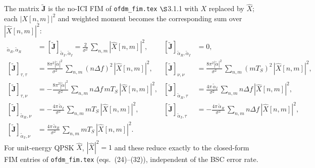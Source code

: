 \documentclass[11pt]{article}
\begin{document}
The matrix \(\tilde{\bm{J}}\) is the no-ICI FIM of \texttt{ofdm\_fim.tex} \(\S\)3.1.1 with \(X\) replaced by \(\hat{X}\); each \(|X[n,m]|^2\) and weighted moment becomes the corresponding sum over \(|\hat{X}[n,m]|^2\):
\begin{align}
    [\tilde{\bm{J}}]_{\tilde{\alpha}_R, \tilde{\alpha}_R} &= [\tilde{\bm{J}}]_{\tilde{\alpha}_I, \tilde{\alpha}_I} = \tfrac{2}{\sigma^2}\, \textstyle\sum_{n,m} |\hat{X}[n,m]|^2, &
    [\tilde{\bm{J}}]_{\tilde{\alpha}_R, \tilde{\alpha}_I} &= 0, \\
    [\tilde{\bm{J}}]_{\tau, \tau} &= \tfrac{8\pi^2 |\tilde{\alpha}|^2}{\sigma^2}\, \textstyle\sum_{n,m} (n\Delta f)^2\, |\hat{X}[n,m]|^2, &
    [\tilde{\bm{J}}]_{\nu, \nu} &= \tfrac{8\pi^2 |\tilde{\alpha}|^2}{\sigma^2}\, \textstyle\sum_{n,m} (mT_S)^2\, |\hat{X}[n,m]|^2, \\
    [\tilde{\bm{J}}]_{\tau, \nu} &= -\tfrac{8\pi^2 |\tilde{\alpha}|^2}{\sigma^2}\, \textstyle\sum_{n,m} n\Delta f\, mT_S\, |\hat{X}[n,m]|^2, &
    [\tilde{\bm{J}}]_{\tilde{\alpha}_R, \tau} &= \tfrac{4\pi\, \tilde{\alpha}_I}{\sigma^2}\, \textstyle\sum_{n,m} n\Delta f\, |\hat{X}[n,m]|^2, \\
    [\tilde{\bm{J}}]_{\tilde{\alpha}_R, \nu} &= -\tfrac{4\pi\, \tilde{\alpha}_I}{\sigma^2}\, \textstyle\sum_{n,m} mT_S\, |\hat{X}[n,m]|^2, &
    [\tilde{\bm{J}}]_{\tilde{\alpha}_I, \tau} &= -\tfrac{4\pi\, \tilde{\alpha}_R}{\sigma^2}\, \textstyle\sum_{n,m} n\Delta f\, |\hat{X}[n,m]|^2, \\
    [\tilde{\bm{J}}]_{\tilde{\alpha}_I, \nu} &= \tfrac{4\pi\, \tilde{\alpha}_R}{\sigma^2}\, \textstyle\sum_{n,m} mT_S\, |\hat{X}[n,m]|^2.
\end{align}
For unit-energy QPSK \(\hat{X}\), \(|\hat{X}|^2 = 1\) and these reduce exactly to the closed-form FIM entries of \texttt{ofdm\_fim.tex} (eqs.\ (24)--(32)), independent of the BSC error rate.
\end{document}
